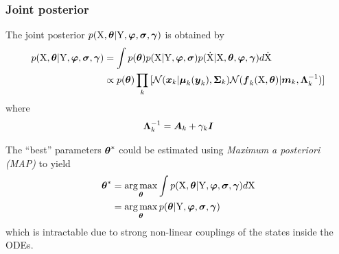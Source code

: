 \begin{frame}[t]
    \frametitle{Joint posterior}
    The joint posterior $p(\mathrm{X},\boldsymbol{\theta}\vert\mathrm{Y},\boldsymbol{\varphi},\boldsymbol{\sigma},\boldsymbol{\gamma})$ is obtained by
    \begin{align}
        p(\mathrm{X},\boldsymbol{\theta}\vert\mathrm{Y},\boldsymbol{\varphi},\boldsymbol{\sigma},\boldsymbol{\gamma})         
        & =      
        \int{
            p(\boldsymbol{\theta})p(\mathrm{X}\vert\mathrm{Y},\boldsymbol{\ensuremath{\varphi}},\boldsymbol{\sigma}) p(\mathrm{\dot{X}}\vert\mathrm{X},\boldsymbol{\theta},\boldsymbol{\ensuremath{\varphi}},\boldsymbol{\gamma}) d\mathrm{\dot{X}}}
        \nonumber
        \\
        & \propto
        p(\boldsymbol{\theta}) \prod_k{[
            \mathcal{N}(\boldsymbol{x}_{k}\vert\boldsymbol{\mu}_{k}(\boldsymbol{y}_{k}), \boldsymbol{\Sigma}_{k}) 
            \mathcal{N}(\boldsymbol{f}_{k}(\mathrm{X}, \boldsymbol{\theta})\vert\boldsymbol{m}_{k},\boldsymbol{\Lambda}_{k}^{-1})]}    
        \label{eq-vgmgp-posterior-joint}
    \end{align}
    where
    \begin{align}
        \boldsymbol{\Lambda}_{k}^{-1} = \boldsymbol{A}_{k} + \gamma_{k}\boldsymbol{I} 
        \nonumber       
    \end{align}
    
    \vspace{\baselineskip}
	The ``best'' parameters $\boldsymbol{\theta}^*$ could be estimated using \emph{Maximum a posteriori (MAP)} to yield
    \begin{align}
        \boldsymbol{\theta}^*
        & = 
        \operatorname*{arg\,max}_{\boldsymbol{\theta}}
            \int{p(\mathrm{X},\boldsymbol{\theta}\vert\mathrm{Y},\boldsymbol{\ensuremath{\varphi}},\boldsymbol{\sigma},\boldsymbol{\gamma})d\mathrm{X}}
        \nonumber
        \\
        & = 
        \operatorname*{arg\,max}_{\boldsymbol{\theta}}
            p(\boldsymbol{\theta}\vert\mathrm{Y},\boldsymbol{\varphi},\boldsymbol{\sigma},\boldsymbol{\gamma})        
        \label{eq-vgmgp-theta-posterior}
    \end{align}
    which is intractable due to strong non-linear couplings of the states inside the ODEs.    
\end{frame}
